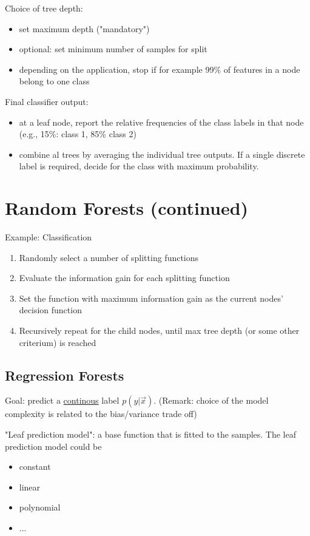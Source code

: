 \documentclass{scrartcl}
\begin{document}
Choice of tree depth:
\begin{itemize}
    \item
        set maximum depth ("mandatory")
    \item
        optional: set minimum number of samples for split 
    \item
        depending on the application, stop if for example 99\% of features in a node belong to one class
\end{itemize}

Final classifier output:
\begin{itemize}
    \item
        at a leaf node, report the relative frequencies of the class labels in that node (e.g., 15\%: class 1, 85\% class 2)
    \item
        combine al trees by averaging the individual tree outputs. If a single discrete label is required, decide for the class with maximum probability.
\end{itemize}

\section{Random Forests (continued)}
Example: Classification
\begin{enumerate}
    \item
        Randomly select a number of splitting functions 
    \item
        Evaluate the information gain for each splitting function
    \item
        Set the function with maximum information gain as the current nodes' decision function
    \item
        Recursively repeat for the child nodes, until max tree depth (or some other criterium) is reached 
\end{enumerate}

\subsection{Regression Forests}
Goal: predict a \underline{continous} label \(p(y|\vec{x})\). (Remark: choice of the model complexity is related to the bias/variance trade off)

"Leaf prediction model": a base function that is fitted to the samples. The leaf prediction model could be
\begin{multicols}{2}
\begin{itemize}
    \item
        constant
    \item
        linear
    \item
        polynomial
    \item
        ...
\end{itemize}
\end{multicols}
\end{document}
